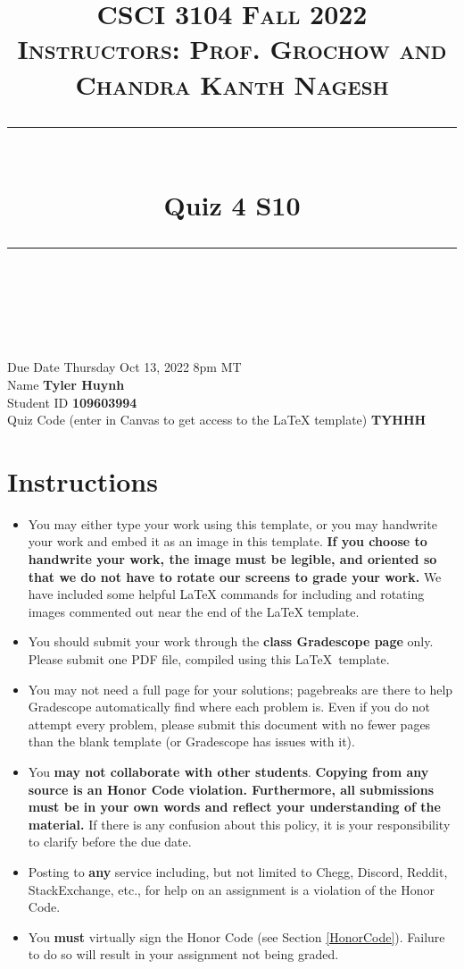 \documentclass[11pt]{article}
\title{
\normalfont \normalsize 
\textsc{CSCI 3104 Fall 2022 \\ 
Instructors: Prof. Grochow and Chandra Kanth Nagesh} \\
[10pt] 
\rule{\linewidth}{0.5pt} \\[6pt] 
\huge Quiz 4 S10 \\
\rule{\linewidth}{2pt}  \\[10pt]
}
\date{}
\theoremstyle{definition}
\theoremstyle{definition}
\theoremstyle{definition}
\begin{document}

\maketitle


\noindent
Due Date \dotfill Thursday Oct 13, 2022 8pm MT \\
Name \dotfill \textbf{Tyler Huynh} \\
Student ID \dotfill \textbf{109603994} \\
Quiz Code (enter in Canvas to get access to the LaTeX template) \dotfill \textbf{TYHHH}


\tableofcontents

\section*{Instructions}
 \begin{itemize}
	\item You may either type your work using this template, or you may handwrite your work and embed it as an image in this template. \textbf{If you choose to handwrite your work, the image must be legible, and oriented so that we do not have to rotate our screens to grade your work.} We have included some helpful LaTeX commands for including and rotating images commented out near the end of the LaTeX template.
	\item You should submit your work through the \textbf{class Gradescope page} only. Please submit one PDF file, compiled using this \LaTeX \ template.
	\item You may not need a full page for your solutions; pagebreaks are there to help Gradescope automatically find where each problem is. Even if you do not attempt every problem, please submit this document with no fewer pages than the blank template (or Gradescope has issues with it).

	\item You \textbf{may not collaborate with other students}. \textbf{Copying from any source is an Honor Code violation. Furthermore, all submissions must be in your own words and reflect your understanding of the material.} If there is any confusion about this policy, it is your responsibility to clarify before the due date. 

	\item Posting to \textbf{any} service including, but not limited to Chegg, Discord, Reddit, StackExchange, etc., for help on an assignment is a violation of the Honor Code.

	\item You \textbf{must} virtually sign the Honor Code (see Section \ref{HonorCode}). Failure to do so will result in your assignment not being graded.
\end{itemize}
\end{document}

